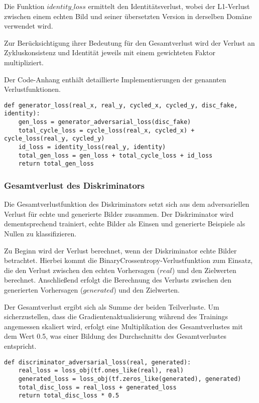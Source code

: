 Die Funktion $identity\_loss$ ermittelt den Identitätsverlust, wobei der L1-Verlust zwischen einem echten Bild und seiner übersetzten Version in derselben Domäne verwendet wird. 

Zur Berücksichtigung ihrer Bedeutung für den Gesamtverlust wird der Verlust an Zykluskonsistenz und Identität jeweils mit einem gewichteten Faktor multipliziert.

Der Code-Anhang enthält detaillierte Implementierungen der genannten Verlustfunktionen.
\newpage
\begin{lstlisting}[language=pyhaff, caption={Gesamtverlust des Generators in CycleGAN}, label={cod:cycleGanGeneratorVerlust}]
def generator_loss(real_x, real_y, cycled_x, cycled_y, disc_fake, identity):
    gen_loss = generator_adversarial_loss(disc_fake)
    total_cycle_loss = cycle_loss(real_x, cycled_x) + cycle_loss(real_y, cycled_y)
    id_loss = identity_loss(real_y, identity)
    total_gen_loss = gen_loss + total_cycle_loss + id_loss
    return total_gen_loss
\end{lstlisting}

\subsubsection{Gesamtverlust des Diskriminators}
Die Gesamtverlustfunktion des Diskriminators setzt sich aus dem adversariellen Verlust für echte und generierte Bilder zusammen. Der Diskriminator wird dementsprechend trainiert, echte Bilder als Einsen und generierte Beispiele als Nullen zu klassifizieren.

Zu Beginn wird der Verlust berechnet, wenn der Diskriminator echte Bilder betrachtet. Hierbei kommt die BinaryCrossentropy-Verlustfunktion zum Einsatz, die den Verlust zwischen den echten Vorhersagen ($real$) und den Zielwerten berechnet. Anschließend erfolgt die Berechnung des Verlusts zwischen den generierten Vorhersagen ($generated$) und den Zielwerten.

Der Gesamtverlust ergibt sich als Summe der beiden Teilverluste. Um sicherzustellen, dass die Gradientenaktualisierung während des Trainings angemessen skaliert wird, erfolgt eine Multiplikation des Gesamtverlustes mit dem Wert 0.5, was einer Bildung des Durchschnitts des Gesamtverlustes entspricht.

\begin{lstlisting}[language=pyhaff, caption={Gesamtverlust des Diskriminators in CycleGAN}, label={cod:cycleGanDiscriminatorVerlust}]
def discriminator_adversarial_loss(real, generated):
    real_loss = loss_obj(tf.ones_like(real), real)
    generated_loss = loss_obj(tf.zeros_like(generated), generated)
    total_disc_loss = real_loss + generated_loss
    return total_disc_loss * 0.5
\end{lstlisting}